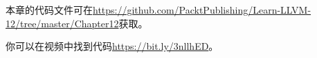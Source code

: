 本章的代码文件可在\url{https://github.com/PacktPublishing/Learn-LLVM-12/tree/master/Chapter12}获取。\par

你可以在视频中找到代码\url{https://bit.ly/3nllhED}。\par